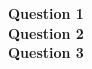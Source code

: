 \documentclass[12pt, letterpaper]{article}
\begin{document}
\graphicspath{ {./} }


\noindent \textbf{Question 1} \\
\noindent \textbf{Question 2} \\
\noindent \textbf{Question 3} \\
\end{document}
